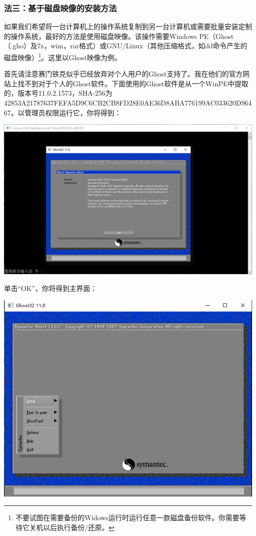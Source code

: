 \subsubsection{法三：基于磁盘映像的安装方法}
如果我们希望将一台计算机上的操作系统复制到另一台计算机或需要批量安装定制的操作系统，最好的方法是使用磁盘映像。该操作需要Windows PE（Ghost（.gho）及7z，wim，rar格式）或GNU/Linux（其他压缩格式，如dd命令产生的磁盘映像）\footnote{不要试图在需要备份的Widows运行时运行任意一款磁盘备份软件。你需要等待它关机以后执行备份/还原。}。这里以Ghost映像为例。\par
首先请注意赛门铁克似乎已经放弃对个人用户的Ghost支持了。我在他们的官方网站上找不到对于个人的Ghost软件。下面使用的Ghost软件是从一个WinPE中提取的，版本号11.0.2.1573，SHA-256为42853A21787637FEFA5D9C6CB2CB8FD28E0AE36D8ABA776199AC033620D96467。以管理员权限运行它，你将得到：
\begin{center}
	\includegraphics[scale=0.5]{pic/sg1}
\end{center}\par
单击“OK”，你将得到主界面：
\begin{center}
	\includegraphics[scale=0.6]{pic/sg2}
\end{center}\par
